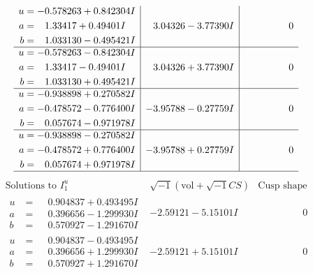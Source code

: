 \documentclass[1p]{elsarticle_modified}
\theoremstyle{definition}
\newcommand{\I}{\sqrt{-1}}
\begin{document}
$$\begin{array}{c|c|c}
\begin{aligned}
u &= -0.578263 + 0.842304 I \\
a &= \phantom{-}1.33417 + 0.49401 I \\
b &= \phantom{-}1.033130 - 0.495421 I\end{aligned}
 & \phantom{-}3.04326 - 3.77390 I & \phantom{-0.000000 } 0 \\ \hline\begin{aligned}
u &= -0.578263 - 0.842304 I \\
a &= \phantom{-}1.33417 - 0.49401 I \\
b &= \phantom{-}1.033130 + 0.495421 I\end{aligned}
 & \phantom{-}3.04326 + 3.77390 I & \phantom{-0.000000 } 0 \\ \hline\begin{aligned}
u &= -0.938898 + 0.270582 I \\
a &= -0.478572 - 0.776400 I \\
b &= \phantom{-}0.057674 - 0.971978 I\end{aligned}
 & -3.95788 - 0.27759 I & \phantom{-0.000000 } 0 \\ \hline\begin{aligned}
u &= -0.938898 - 0.270582 I \\
a &= -0.478572 + 0.776400 I \\
b &= \phantom{-}0.057674 + 0.971978 I\end{aligned}
 & -3.95788 + 0.27759 I & \phantom{-0.000000 } 0\\
 \hline 
 \end{array}$$\newpage$$\begin{array}{c|c|c}  
\text{Solutions to }I^u_{1}& \I (\text{vol} + \sqrt{-1}CS) & \text{Cusp shape}\\
 \hline 
\begin{aligned}
u &= \phantom{-}0.904837 + 0.493495 I \\
a &= \phantom{-}0.396656 - 1.299930 I \\
b &= \phantom{-}0.570927 - 1.291670 I\end{aligned}
 & -2.59121 - 5.15101 I & \phantom{-0.000000 } 0 \\ \hline\begin{aligned}
u &= \phantom{-}0.904837 - 0.493495 I \\
a &= \phantom{-}0.396656 + 1.299930 I \\
b &= \phantom{-}0.570927 + 1.291670 I\end{aligned}
 & -2.59121 + 5.15101 I & \phantom{-0.000000 } 0 \\ \hline\begin{aligned}

\end{aligned}
\end{array}$$
\end{document}
